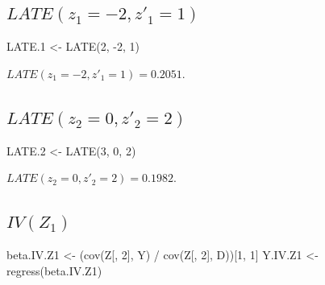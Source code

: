 \documentclass[9pt,twocolumn,twoside,]{pnas-new}
\newenvironment{Shaded}{}{}
\newcommand{\DecValTok}[1]{\textcolor[rgb]{0.25,0.63,0.44}{#1}}
\newcommand{\FloatTok}[1]{\textcolor[rgb]{0.25,0.63,0.44}{#1}}
\newcommand{\FunctionTok}[1]{\textcolor[rgb]{0.02,0.16,0.49}{#1}}
\newcommand{\NormalTok}[1]{#1}
\newcommand{\OtherTok}[1]{\textcolor[rgb]{0.00,0.44,0.13}{#1}}
\newcommand{\SpecialCharTok}[1]{\textcolor[rgb]{0.25,0.44,0.63}{#1}}
\begin{document}
\hypertarget{latez_1--2-z_1-1}{%
\subsection{\texorpdfstring{\(LATE(z_1 = -2, z'_1 = 1)\)}{LATE(z\_1 = -2, z'\_1 = 1)}}\label{latez_1--2-z_1-1}}

\begin{Shaded}
\begin{Highlighting}[]
\NormalTok{LATE}\FloatTok{.1} \OtherTok{\textless{}{-}} \FunctionTok{LATE}\NormalTok{(}\DecValTok{2}\NormalTok{, }\SpecialCharTok{{-}}\DecValTok{2}\NormalTok{, }\DecValTok{1}\NormalTok{)}
\end{Highlighting}
\end{Shaded}

\(LATE(z_1 = -2, z'_1 = 1) = 0.2051\).

\hypertarget{latez_2-0-z_2-2}{%
\subsection{\texorpdfstring{\(LATE(z_2 = 0, z'_2 = 2)\)}{LATE(z\_2 = 0, z'\_2 = 2)}}\label{latez_2-0-z_2-2}}

\begin{Shaded}
\begin{Highlighting}[]
\NormalTok{LATE}\FloatTok{.2} \OtherTok{\textless{}{-}} \FunctionTok{LATE}\NormalTok{(}\DecValTok{3}\NormalTok{, }\DecValTok{0}\NormalTok{, }\DecValTok{2}\NormalTok{)}
\end{Highlighting}
\end{Shaded}

\(LATE(z_2 = 0, z'_2 = 2) = 0.1982\).

\hypertarget{ivz_1}{%
\subsection{\texorpdfstring{\(IV(Z_1)\)}{IV(Z\_1)}}\label{ivz_1}}

\begin{Shaded}
\begin{Highlighting}[]
\NormalTok{beta.IV.Z1 }\OtherTok{\textless{}{-}}\NormalTok{ (}\FunctionTok{cov}\NormalTok{(Z[, }\DecValTok{2}\NormalTok{], Y) }\SpecialCharTok{/} \FunctionTok{cov}\NormalTok{(Z[, }\DecValTok{2}\NormalTok{], D))[}\DecValTok{1}\NormalTok{, }\DecValTok{1}\NormalTok{]}
\NormalTok{Y.IV.Z1 }\OtherTok{\textless{}{-}} \FunctionTok{regress}\NormalTok{(beta.IV.Z1)}
\end{Highlighting}
\end{Shaded}
\end{document}

